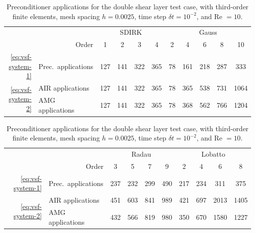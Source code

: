 \documentclass[review]{siamart}
\begin{document}
\begin{table}[h!]
	\centering
	\caption{Preconditioner applications for the double shear layer test case, with third-order
	finite elements, mesh spacing $h=0.0025$, time step $\delta t = 10^{-2}$, and Re $=10$.}
	\label{tab:dsl-iters}
	\begin{tabular}{rl|cccc|ccccc}
		\toprule
		&& \multicolumn{4}{c|}{SDIRK} & \multicolumn{5}{c}{Gauss} \\
		& \multicolumn{1}{r|}{Order}  & 1 & 2 & 3 & 4 & 2 & 4 & 6 & 8 & 10\\
		\midrule
		\eqref{eq:vsf-system-1} & Prec.\ applications & 127 & 141 & 322 & 365 & 78 & 161 & 218 & 287 & 333 \\
		\midrule
		\multirow{2}{*}{\eqref{eq:vsf-system-2}} & AIR applications & 127 & 141 & 322 & 365 & 78 & 365 & 538 & 731 & 1064\\
		& AMG applications & 127 & 141 & 322 & 365 & 78 & 368 & 562 & 766 & 1204 \\
		\bottomrule
	\end{tabular}

	\vspace{\floatsep}

	\begin{tabular}{rl|cccc|cccc}
		\toprule
		&& \multicolumn{4}{c|}{Radau} & \multicolumn{4}{c}{Lobatto} \\
		& \multicolumn{1}{r|}{Order} & 3 & 5 & 7 & 9 & 2 & 4 & 6 & 8\\
		\midrule
		\eqref{eq:vsf-system-1} & Prec.\ applications & 237 & 232 & 299 & 490 & 217 & 234 & 311 & 375 \\
		\midrule
		\multirow{2}{*}{\eqref{eq:vsf-system-2}} & AIR applications & 451 & 603 & 841 & 989 & 421 & 697 & 2013 & 1405 \\
		& AMG applications & 432 & 566 & 819 & 980 & 350 & 670 & 1580 & 1227\\
		\bottomrule
	\end{tabular}
\end{table}
\end{document}
